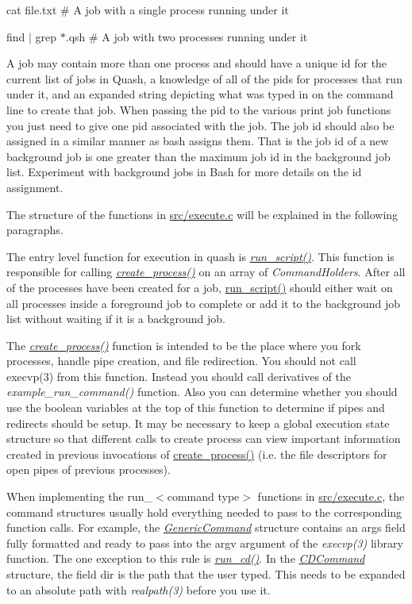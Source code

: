 cat file.\-txt \# A job with a single process running under it

find $\vert$ grep $\ast$.qsh \# A job with two processes running under it

A job may contain more than one process and should have a unique id for the current list of jobs in Quash, a knowledge of all of the pids for processes that run under it, and an expanded string depicting what was typed in on the command line to create that job. When passing the pid to the various print job functions you just need to give one pid associated with the job. The job id should also be assigned in a similar manner as bash assigns them. That is the job id of a new background job is one greater than the maximum job id in the background job list. Experiment with background jobs in Bash for more details on the id assignment.

The structure of the functions in \hyperlink{execute_8c}{src/execute.\-c} will be explained in the following paragraphs.

The entry level function for execution in quash is {\itshape \hyperlink{execute_8c_a4dab67459028f3b5a60d1a3695933f4b}{run\-\_\-script()}}. This function is responsible for calling {\itshape \hyperlink{execute_8c_a3ddd977c77859472a1d8baea3a5b7faf}{create\-\_\-process()}} on an array of {\itshape Command\-Holders}. After all of the processes have been created for a job, \hyperlink{execute_8c_a4dab67459028f3b5a60d1a3695933f4b}{run\-\_\-script()} should either wait on all processes inside a foreground job to complete or add it to the background job list without waiting if it is a background job.

The {\itshape \hyperlink{execute_8c_a3ddd977c77859472a1d8baea3a5b7faf}{create\-\_\-process()}} function is intended to be the place where you fork processes, handle pipe creation, and file redirection. You should not call execvp(3) from this function. Instead you should call derivatives of the {\itshape example\-\_\-run\-\_\-command()} function. Also you can determine whether you should use the boolean variables at the top of this function to determine if pipes and redirects should be setup. It may be necessary to keep a global execution state structure so that different calls to create process can view important information created in previous invocations of \hyperlink{execute_8c_a3ddd977c77859472a1d8baea3a5b7faf}{create\-\_\-process()} (i.\-e. the file descriptors for open pipes of previous processes).

When implementing the run\-\_\-$<$command type$>$ functions in \hyperlink{execute_8c}{src/execute.\-c}, the command structures usually hold everything needed to pass to the corresponding function calls. For example, the {\itshape \hyperlink{structGenericCommand}{Generic\-Command}} structure contains an args field fully formatted and ready to pass into the argv argument of the {\itshape execvp(3)} library function. The one exception to this rule is {\itshape \hyperlink{execute_8c_a8e9aed155e5ccf7e207a8f3ce4789d83}{run\-\_\-cd()}}. In the {\itshape \hyperlink{structCDCommand}{C\-D\-Command}} structure, the field dir is the path that the user typed. This needs to be expanded to an absolute path with {\itshape realpath(3)} before you use it.

